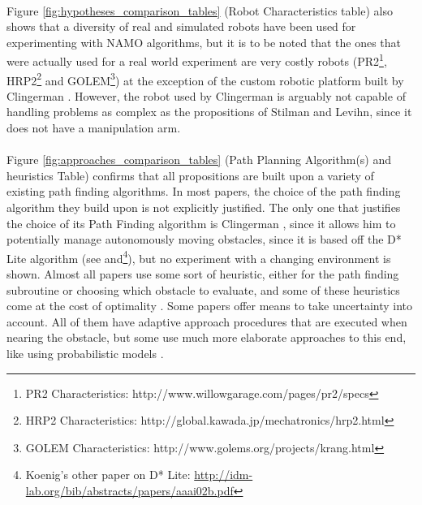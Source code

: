 \paragraph{} Figure \ref{fig:hypotheses_comparison_tables} (Robot Characteristics table) also shows that a diversity of real and simulated robots have been used for experimenting with NAMO algorithms, but it is to be noted that the ones that were actually used for a real world experiment are very costly robots (PR2\footnote{PR2 Characteristics: http://www.willowgarage.com/pages/pr2/specs}, HRP2\footnote{HRP2 Characteristics: http://global.kawada.jp/mechatronics/hrp2.html} and GOLEM\footnote{GOLEM Characteristics: http://www.golems.org/projects/krang.html}) at the exception of the custom robotic platform built by Clingerman \parencite{clingerman_estimating_2014}. However, the robot used by Clingerman is arguably not capable of handling problems as complex as the propositions of Stilman and Levihn, since it does not have a manipulation arm.

\paragraph{} Figure \ref{fig:approaches_comparison_tables} (Path Planning Algorithm(s) and heuristics Table) confirms that all propositions are built upon a variety of existing path finding algorithms. In most papers, the choice of the path finding algorithm they build upon is not explicitly justified. The only one that justifies the choice of its Path Finding algorithm is Clingerman \parencite{clingerman_dynamic_2015}, since it allows him to potentially manage autonomously moving obstacles, since it is based off the D* Lite algorithm (see \parencite{koenig_fast_2005} and\footnote{Koenig's other paper on D* Lite: \url{http://idm-lab.org/bib/abstracts/papers/aaai02b.pdf}}), but no experiment with a changing environment is shown. Almost all papers use some sort of heuristic, either for the path finding subroutine or choosing which obstacle to evaluate, and some of these heuristics come at the cost of optimality \parencite{stilman_navigation_2005, wu_navigation_2010}. Some papers \parencite{stilman_planning_2007, levihn_foresight_2013, levihn_planning_2013, clingerman_estimating_2014, clingerman_dynamic_2015, scholz_navigation_2016} offer means to take uncertainty into account. All of them have adaptive approach procedures that are executed when nearing the obstacle, but some use much more elaborate approaches to this end, like using probabilistic models \parencite{levihn_planning_2013, scholz_navigation_2016}.

